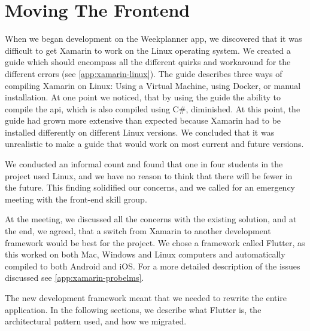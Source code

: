 \section{Moving The Frontend}\label{sec:MovingTheFrontend}

When we began development on the Weekplanner app, we discovered that it was difficult to get Xamarin to work on the Linux operating system. We created a guide which should encompass all the different quirks and workaround for the different errors (see \autoref{app:xamarin-linux}). The guide describes three ways of compiling Xamarin on Linux: Using a Virtual Machine, using Docker, or manual installation. At one point we noticed, that by using the guide the ability to compile the \gls{api}, which is also compiled using C\#, diminished. At this point, the guide had grown more extensive than expected because Xamarin had to be installed differently on different Linux versions. We concluded that it was unrealistic to make a guide that would work on most current and future versions.

We conducted an informal count and found that one in four students in the project used Linux, and we have no reason to think that there will be fewer in the future. This finding solidified our concerns, and we called for an emergency meeting with the front-end skill group.

At the meeting, we discussed all the concerns with the existing solution, and at the end, we agreed, that a switch from Xamarin to another development framework would be best for the project. We chose a framework called Flutter\cite{flutter:website}, as this worked on both Mac, Windows and Linux computers and automatically compiled to both Android and iOS. For a more detailed description of the issues discussed see \autoref{app:xamarin-probelms}.

The new development framework meant that we needed to rewrite the entire application. In the following sections, we describe what Flutter is, the architectural pattern used, and how we migrated.
